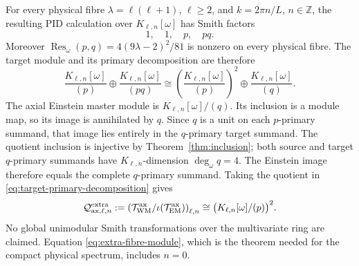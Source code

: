 \documentclass[11pt]{article}
\theoremstyle{remark}
\newcommand{\cT}{\mathcal T}
\newcommand{\cQ}{\mathcal Q}
\begin{document}
For every physical fibre
$\lambda=\ell(\ell+1)$, $\ell\geq2$, and
$k=2\pi n/L$, $n\in\mathbb Z$, the resulting PID calculation over
$K_{\ell,n}[\omega]$ has Smith factors
\begin{equation}\label{eq:fibre-smith}
 1,\quad1,\quad p,\quad pq.
\end{equation}
Moreover
$\operatorname{Res}_{\omega}(p,q)=4(9\lambda-2)^2/81$ is nonzero on every
physical fibre. The target module and its primary decomposition are therefore
\begin{equation}\label{eq:target-primary-decomposition}
 \frac{K_{\ell,n}[\omega]}{(p)}\oplus
 \frac{K_{\ell,n}[\omega]}{(pq)}
 \cong
 \left(\frac{K_{\ell,n}[\omega]}{(p)}\right)^2
 \oplus\frac{K_{\ell,n}[\omega]}{(q)}.
\end{equation}
The axial Einstein master module is $K_{\ell,n}[\omega]/(q)$. Its inclusion
is a module map, so its image is annihilated by $q$. Since $q$ is a unit on
each $p$-primary summand, that image lies entirely in the $q$-primary target
summand. The quotient inclusion is injective by
Theorem~\ref{thm:inclusion}; both source and target $q$-primary summands have
$K_{\ell,n}$-dimension $\deg_\omega q=4$. The Einstein image therefore equals
the complete $q$-primary summand. Taking the quotient in
\eqref{eq:target-primary-decomposition} gives
\begin{equation}\label{eq:extra-fibre-module}
 \cQ_{{\rm ax},\ell,n}^{\rm extra}
 :=\left(\cT_{\rm WM}^{\rm ax}/
 \iota(\cT_{\rm EM}^{\rm ax})\right)_{\ell,n}
 \cong\bigl(K_{\ell,n}[\omega]/(p)\bigr)^2.
\end{equation}
No global unimodular Smith transformations over the multivariate ring are
claimed. Equation \eqref{eq:extra-fibre-module}, which is the theorem needed
for the compact physical spectrum, includes $n=0$.
\end{document}
